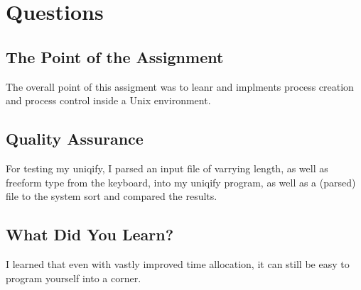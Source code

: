 \documentclass[letterpaper,10pt,titlepage]{article}
\begin{document}
\section{Questions}
\label{Project Quesions}
\subsection{The Point of the Assignment}
\label{Point}
The overall point of this assigment was to leanr and implments process creation and process control inside a Unix environment.
\subsection{Quality Assurance}
\label{QA}
For testing my uniqify, I parsed an input file of varrying length, as well as freeform type from the keyboard, into my uniqify program, as well as a (parsed) file to the system sort and compared the results.
\subsection{What Did You Learn?}
\label{Learned}
I learned that even with vastly improved time allocation, it can still be easy to program yourself into a corner.
\end{document}
